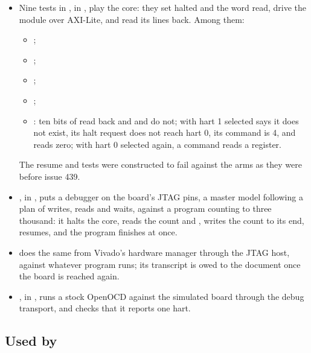\begin{itemize}
\item Nine tests in , in
, play the core: they set halted and
the word read, drive the module over AXI-Lite, and read its lines
back. Among them:
\begin{itemize}
\item {};
\item {}\-;
\item {}\-;
\item {}\-;
\item {}: ten bits of  read
back and  and  do not; with hart 1
selected  says it does not exist, its halt request does
not reach hart 0, its command is  4, and
 reads zero; with hart 0 selected again, a command
reads a register.
\end{itemize}
The resume and  tests were constructed to fail against
the arms as they were before issue 439.
\item {},
in , puts a debugger on the board's
JTAG pins, a master model following a plan of writes, reads and
waits, against a program counting to three thousand: it halts the
core, reads the count and , writes the count to its end,
resumes, and the program finishes at once.
\item {} does the same from
Vivado's hardware manager through the JTAG host, against whatever
program runs; its transcript is owed to the document once the board
is reached again.
\item {}\allowbreak
{},
in , runs a stock OpenOCD against the
simulated board through the debug transport, and checks that it
reports one hart.
\end{itemize}

\subsection*{Used by}

